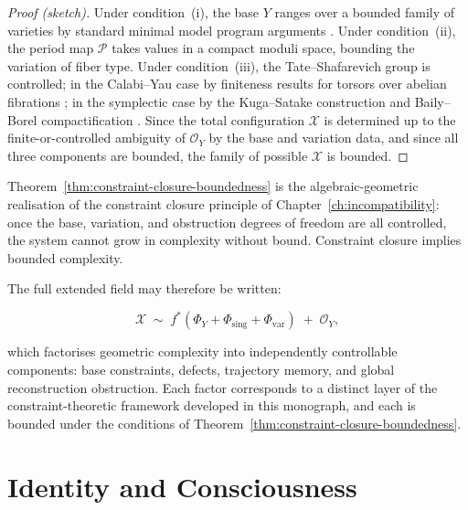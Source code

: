 \documentclass[11pt,openany]{book}
\begin{document}
\begin{proof}[Proof (sketch)]
Under condition~(i), the base $Y$ ranges over a bounded
family of varieties by standard minimal model program
arguments \citep{birkar2018}.  Under condition~(ii), the
period map $\mathcal{P}$ takes values in a compact
moduli space, bounding the variation of fiber type.
Under condition~(iii), the Tate--Shafarevich group is
controlled; in the Calabi--Yau case by finiteness results
for torsors over abelian fibrations \citep{dolgachevgross1994};
in the symplectic case by the Kuga--Satake construction
and Baily--Borel compactification \citep{deligne1971}.
Since the total configuration $\mathcal{X}$ is determined
up to the finite-or-controlled ambiguity of $\mathcal{O}_Y$
by the base and variation data, and since all three
components are bounded, the family of possible
$\mathcal{X}$ is bounded.
\end{proof}

\begin{remark}
Theorem~\ref{thm:constraint-closure-boundedness} is the
algebraic-geometric realisation of the constraint closure
principle of Chapter~\ref{ch:incompatibility}: once the
base, variation, and obstruction degrees of freedom are
all controlled, the system cannot grow in complexity
without bound.  Constraint closure implies bounded
complexity.
\end{remark}

The full extended field may therefore be written:

\begin{equation}
  \label{eq:full-decomposition}
  \mathcal{X} \;\sim\;
    f^*\!\left(
      \Phi_Y + \Phi_{\mathrm{sing}} + \Phi_{\mathrm{var}}
    \right)
    \;+\; \mathcal{O}_Y,
\end{equation}

which factorises geometric complexity into independently
controllable components: base constraints, defects,
trajectory memory, and global reconstruction obstruction.
Each factor corresponds to a distinct layer of the
constraint-theoretic framework developed in this monograph,
and each is bounded under the conditions of
Theorem~\ref{thm:constraint-closure-boundedness}.



\part{Identity and Consciousness}
\end{document}
